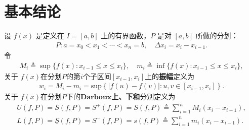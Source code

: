 \documentclass[../../main.tex]{subfiles}%
\begin{document}
\section{基本结论}

\begin{definition}[Riemann积分Darboux上、下和]
设 \( f(x) \) 是定义在 \( I = [a,b] \) 上的有界函数，\( P \) 是对 \([a,b]\) 所做的分划：
\begin{gather*}
P : a = x_0 < x_1 < \cdots < x_n = b,\quad \Delta x_i=x_i-x_{i-1}.
\end{gather*}
令
\begin{gather*}
M_i \triangleq \sup \{ f(x) : x_{i - 1} \leqslant x \leqslant x_i \},
\quad 
m_i \triangleq \inf \{ f(x) : x_{i - 1}\leqslant x \leqslant x_i \},
\end{gather*}
关于 \( f(x) \)在分划$P$的第$i$个子区间$[x_{i-1},x_i]$上的\textbf{振幅}定义为
\begin{align*}
w_{i}=M_{i}-m_{i}=\mathrm{sup}\left\{ \left| f\left( u \right) -f\left( v \right) \right|:u,v\in \left[ x_{i-1},x_i \right] \right\} .
\end{align*}
关于 \( f(x) \)在分划$P$下的$\mathbf{Darboux}$\textbf{上、下和}分别定义为
\begin{gather*}
U\left( f,P \right) =\overline{S}\left( f,P \right) =S^+\left( f,P \right) =S\left( f,P \right) \triangleq \sum_{i=1}^{n}{M_{i}\left( x_{i}-x_{i-1} \right)},
\\
L\left( f,P \right) =\underline{S}\left( f,P \right) =S^-\left( f,P \right) =s\left( f,P \right) \triangleq \sum_{i=1}^{n}{m_{i}\left( x_{i}-x_{i-1}\right)}.
\end{gather*}
\end{definition}
\end{document}
